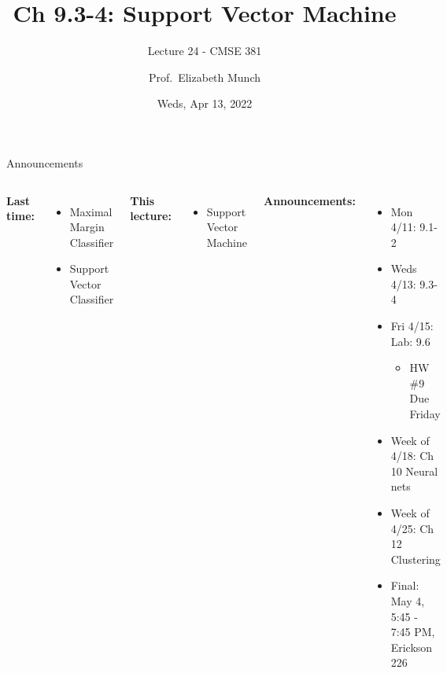 \documentclass[aspectratio=169,usenames,dvipsnames]{beamer}
\begin{document}
\title[]{Ch 9.3-4: Support Vector Machine}
\subtitle{Lecture 24 - CMSE 381}
\date{Weds, Apr 13, 2022}



\author[Dr.~Munch]{Prof.~Elizabeth Munch}

\begin{frame}
 \titlepage


\end{frame}
\begin{frame}[c]{Announcements }

\begin{columns}
\centering

	\textbf{Last time:}
	\begin{itemize}
	\item Maximal Margin Classifier
	\item Support Vector Classifier
	\end{itemize}

	\vspace{.2in}

	\textbf{This lecture:}
	\begin{itemize}
		\item Support Vector Machine
\end{itemize}


\centering

\textbf{Announcements:}
	\begin{itemize}
	\item Mon 4/11: 9.1-2
	\item Weds 4/13: 9.3-4
	\item Fri 4/15: Lab: 9.6
	\begin{itemize}
		\item HW \#9 Due Friday
	\end{itemize}
	\item Week of 4/18: Ch 10 Neural nets
	\item Week of 4/25: Ch 12 Clustering
	\item Final: May 4, 5:45 - 7:45 PM, Erickson 226

	\end{itemize}
\end{columns}

\end{frame}
\end{document}
